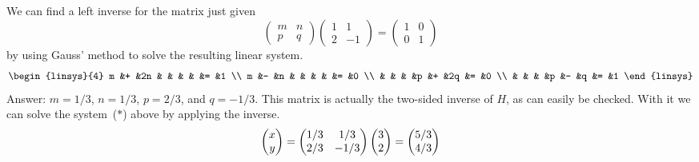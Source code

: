 \begin{example}  \label{ex:InverseByLinSys}
We can find a left inverse for the matrix just given
\begin{equation*}
    \begin{pmatrix}
       m  &n  \\
       p  &q
    \end{pmatrix}
    \begin{pmatrix}
       1  &1  \\
       2  &-1
    \end{pmatrix}
  =
    \begin{pmatrix}
       1  &0  \\
       0  &1
    \end{pmatrix}
\end{equation*}
by using Gauss' method to solve the resulting linear system.
\begin{equation*}
  \begin{linsys}{4}
     m  &+  &2n  &    &   &   &    &=  &1     \\
     m  &-  &n   &    &   &   &    &=  &0     \\
        &   &    &    &p  &+  &2q  &=  &0     \\
        &   &    &    &p  &-  &q   &=  &1     
     \end{linsys}
\end{equation*}
Answer: \( m=1/3 \), \( n=1/3 \), \( p=2/3 \), and \( q=-1/3 \).
This matrix is actually the two-sided inverse of $H$, 
as can easily be checked.
With it we can solve the system~($*$) above by
applying the inverse.
\begin{equation*}
  \begin{pmatrix} x \\ y \end{pmatrix}
  =\begin{pmatrix}
       1/3  &1/3  \\
       2/3  &-1/3
    \end{pmatrix}
  \begin{pmatrix} 3 \\ 2 \end{pmatrix}          
  =\begin{pmatrix} 5/3 \\ 4/3 \end{pmatrix}
\end{equation*}
\end{example}

